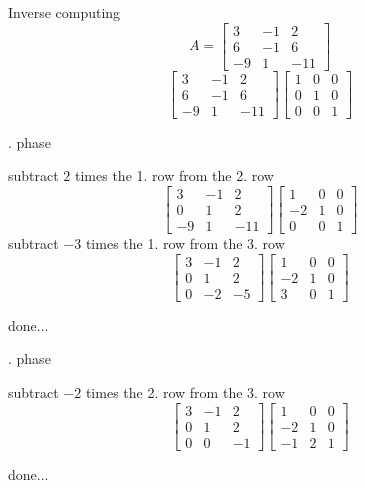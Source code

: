 \documentclass[12pt]{article}
\begin{document}
Inverse computing
$$ A=\left[{\begin{array}{ccc}3& -1& 2\\ 6& -1& 6\\ -9& 1& -11\end{array}}\right]$$
$$\left[{\begin{array}{ccc}3& -1& 2\\ 6& -1& 6\\ -9& 1& -11\end{array}}\right]\left[{\begin{array}{ccc}1& 0& 0\\ 0& 1& 0\\ 0& 0& 1\end{array}}\right]$$
\par{}. phase

subtract $2$ times the 1. row from the 2. row
$$\left[{\begin{array}{ccc}3& -1& 2\\ 0& 1& 2\\ -9& 1& -11\end{array}}\right]\left[{\begin{array}{ccc}1& 0& 0\\ -2& 1& 0\\ 0& 0& 1\end{array}}\right]$$
subtract $-3$ times the 1. row from the 3. row
$$\left[{\begin{array}{ccc}3& -1& 2\\ 0& 1& 2\\ 0& -2& -5\end{array}}\right]\left[{\begin{array}{ccc}1& 0& 0\\ -2& 1& 0\\ 3& 0& 1\end{array}}\right]$$
\par\noindent done...


\par{}. phase

subtract $-2$ times the 2. row from the 3. row
$$\left[{\begin{array}{ccc}3& -1& 2\\ 0& 1& 2\\ 0& 0& -1\end{array}}\right]\left[{\begin{array}{ccc}1& 0& 0\\ -2& 1& 0\\ -1& 2& 1\end{array}}\right]$$
\par\noindent done...
\end{document}
